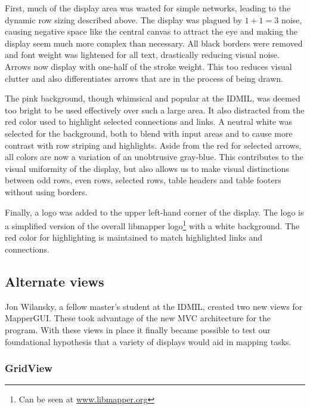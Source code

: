 First, much of the display area was wasted for simple networks, leading to the dynamic row sizing described above. The display was plagued by $1 + 1 = 3$ noise, causing negative space like the central canvas to attract the eye and making the display seem much more complex than necessary. All black borders were removed and font weight was lightened for all text, drastically reducing visual noise. Arrows now display with one-half of the stroke weight. This too reduces visual clutter and also differentiates arrows that are in the process of being drawn.

The pink background, though whimsical and popular at the IDMIL, was deemed too bright to be used effectively over such a large area. It also distracted from the red color used to highlight selected connections and links. A neutral white was selected for the background, both to blend with input areas and to cause more contrast with row striping and highlights. Aside from the red for selected arrows, all colors are now a variation of an unobtrusive gray-blue. This contributes to the visual uniformity of the display, but also allows us to make visual distinctions between odd rows, even rows, selected rows, table headers and table footers without using borders.

Finally, a logo was added to the upper left-hand corner of the display. The logo is a simplified version of the overall libmapper logo\footnote{Can be seen at \url{www.libmapper.org}} with a white background. The red color for highlighting is maintained to match highlighted links and connections.


	\subsection{Alternate views} %
	\label{sec:alternate_views}

Jon Wilansky, a fellow master's student at the IDMIL, created two new views for MapperGUI. These took advantage of the new MVC architecture for the program. With these views in place it finally became possible to test our foundational hypothesis that a variety of displays would aid in mapping tasks.

		\subsubsection{GridView}

